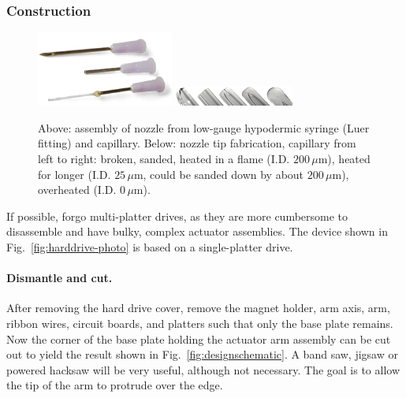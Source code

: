 \documentclass[11.5pt]{book}
\newcommand*{\figref}[1]{Fig.~\ref{#1}}
\begin{document}
\subsubsection{Construction}
\begin{figure}
\centering
\includegraphics[width=0.4\textwidth]{img/setup/needles.png}
\includegraphics[width=0.35\textwidth]{img/setup/needletips.png}
\caption{Above: assembly of nozzle from
low-gauge hypodermic syringe (Luer fitting) and capillary. Below: nozzle tip
fabrication, capillary from left to right: broken, sanded, heated in a flame (I.D.
$200\,\mu$m), heated for longer (I.D. $25\,\mu$m, could be sanded down by about
$200\,\mu$m), overheated (I.D. $0\,\mu$m). \label{fig:needles}}
\end{figure}
If possible, forgo multi-platter drives, as they are more cumbersome to disassemble and have
bulky, complex actuator assemblies. The device shown in \figref{fig:harddrive-photo}
is based on a single-platter drive.

\paragraph{Dismantle and cut.} After removing the hard drive cover, remove
the magnet holder, arm axis, arm, ribbon wires, circuit boards, and platters
such that only the base plate remains. Now the corner of the base plate holding
the actuator arm assembly can be cut out to yield the result shown in
\figref{fig:designschematic}. A band saw, jigsaw or powered hacksaw will be
very useful, although not necessary. The goal is to allow the tip of the arm to
protrude over the edge.
\end{document}
